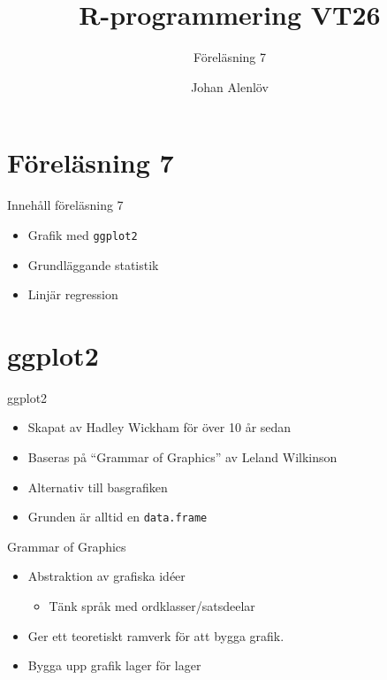 \documentclass[
  11pt,
  ignorenonframetext,
  handout]{beamer}
\title{\texorpdfstring{R-programmering VT26}{R-programmering VT26}}
\subtitle{\texorpdfstring{Föreläsning 7}{Föreläsning 7}}
\author{\texorpdfstring{Johan Alenlöv}{Johan Alenlöv}}
\date{}
\institute{Linköpings Universitet}
\providecommand{\tightlist}{%
  \setlength{\itemsep}{0pt}\setlength{\parskip}{0pt}}
\begin{document}
\frame{\titlepage}

\section{Föreläsning 7}\label{fuxf6reluxe4sning-7}

\begin{frame}{Innehåll föreläsning 7}
\protect{}\label{innehuxe5ll-fuxf6reluxe4sning-7}
\begin{itemize}
\tightlist
\item
  Grafik med \texttt{ggplot2}
\item
  Grundläggande statistik
\item
  Linjär regression
\end{itemize}
\end{frame}

\section{ggplot2}\label{ggplot2}

\begin{frame}{ggplot2}
\protect{}\label{ggplot2-1}
\begin{itemize}
\tightlist
\item
  Skapat av Hadley Wickham för över 10 år sedan
\item
  Baseras på ``Grammar of Graphics'' av Leland Wilkinson
\item
  Alternativ till basgrafiken
\item
  Grunden är alltid en \texttt{data.frame}
\end{itemize}
\end{frame}

\begin{frame}{Grammar of Graphics}
\protect{}\label{grammar-of-graphics}
\begin{itemize}
\tightlist
\item
  Abstraktion av grafiska idéer

  \begin{itemize}
  \tightlist
  \item
    Tänk språk med ordklasser/satsdeelar
  \end{itemize}
\item
  Ger ett teoretiskt ramverk för att bygga grafik.
\item
  Bygga upp grafik lager för lager
\end{itemize}
\end{frame}
\end{document}
